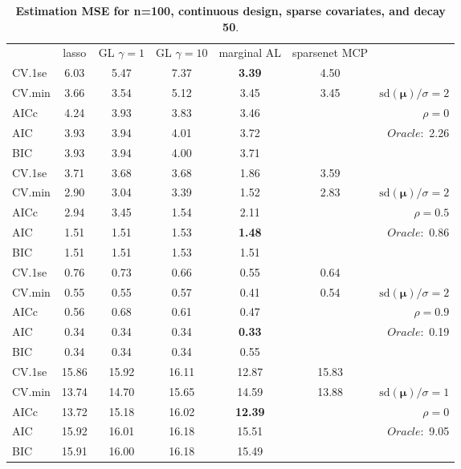 \begin{table}\vspace{-.5cm}
\caption[l]{ { \bf Estimation MSE for n=100, continuous design, 
sparse covariates, and  decay  50}.}
\vspace{-.5cm}
\footnotesize{}
\begin{center}
\begin{tabular}{l*{5}{c}|r}
& lasso & GL $\gamma=1$ & GL $\gamma=10$ & marginal AL & sparsenet MCP  & \\
 \cline{1-7}
CV.1se & 6.03 & 5.47 & 7.37 & {\bf 3.39} & 4.50 & \\
CV.min & 3.66 & 3.54 & 5.12 & 3.45 & 3.45 &  $\mathrm{sd}(\mathbf{\mu})/\sigma=2$ \\
AICc & 4.24 & 3.93 & 3.83 & 3.46 & & $\rho=0$ \\
AIC & 3.93 & 3.94 & 4.01 & 3.72 & &  \multirow{2}{*}{$Oracle: $ 2.26} \\
BIC & 3.93 & 3.94 & 4.00 & 3.71 & &  \\
 \hline 
CV.1se & 3.71 & 3.68 & 3.68 & 1.86 & 3.59 & \\
CV.min & 2.90 & 3.04 & 3.39 & 1.52 & 2.83 &  $\mathrm{sd}(\mathbf{\mu})/\sigma=2$ \\
AICc & 2.94 & 3.45 & 1.54 & 2.11 & & $\rho=0.5$ \\
AIC & 1.51 & 1.51 & 1.53 & {\bf 1.48} & &  \multirow{2}{*}{$Oracle: $ 0.86} \\
BIC & 1.51 & 1.51 & 1.53 & 1.51 & &  \\
 \hline 
CV.1se & 0.76 & 0.73 & 0.66 & 0.55 & 0.64 & \\
CV.min & 0.55 & 0.55 & 0.57 & 0.41 & 0.54 &  $\mathrm{sd}(\mathbf{\mu})/\sigma=2$ \\
AICc & 0.56 & 0.68 & 0.61 & 0.47 & & $\rho=0.9$ \\
AIC & 0.34 & 0.34 & 0.34 & {\bf 0.33} & &  \multirow{2}{*}{$Oracle: $ 0.19} \\
BIC & 0.34 & 0.34 & 0.34 & 0.55 & &  \\
 \hline 
CV.1se & 15.86 & 15.92 & 16.11 & 12.87 & 15.83 & \\
CV.min & 13.74 & 14.70 & 15.65 & 14.59 & 13.88 &  $\mathrm{sd}(\mathbf{\mu})/\sigma=1$ \\
AICc & 13.72 & 15.18 & 16.02 & {\bf 12.39} & & $\rho=0$ \\
AIC & 15.92 & 16.01 & 16.18 & 15.51 & &  \multirow{2}{*}{$Oracle: $ 9.05} \\
BIC & 15.91 & 16.00 & 16.18 & 15.49 & &  \\
 \hline 

\end{tabular}
\end{center}
\end{table}
